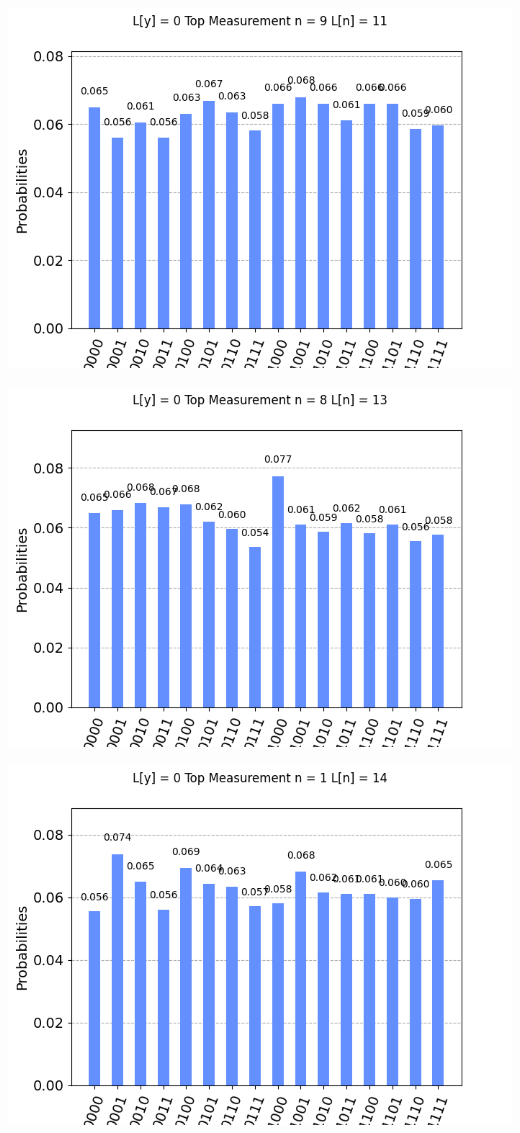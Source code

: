 \documentclass[11pt]{article}
\begin{document}
\includegraphics[width=\textwidth]{custom_1.png}
\centering

\includegraphics[width=\textwidth]{custom_2.png}
\centering

\includegraphics[width=\textwidth]{custom_3.png}
\centering
\end{document}
